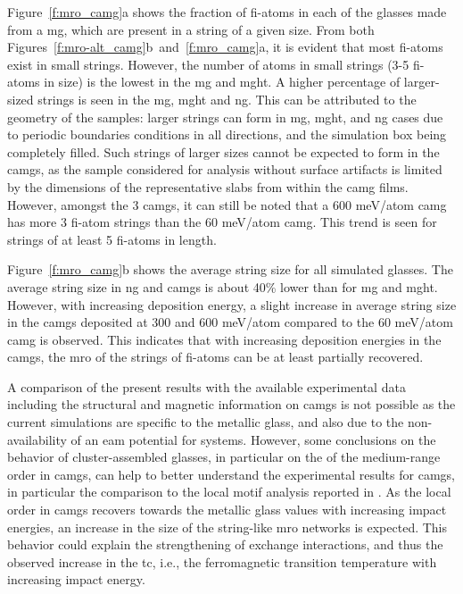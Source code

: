 \begin{changebar}
Figure~\ref{f:mro_camg}a shows the fraction of \gls{fi}-atoms in each of the glasses made from a  \gls{mg}, which are present in a string of a given size. From both Figures~\ref{f:mro-alt_camg}b~and~\ref{f:mro_camg}a, it is evident that most \gls{fi}-atoms exist in small strings. However, the number of atoms in small strings (3-5 \gls{fi}-atoms in size) is the lowest in the \gls{mg} and \gls{mght}. A higher percentage of larger-sized strings is seen in the \gls{mg}, \gls{mght} and \gls{ng}. This can be attributed to the geometry of the samples: larger strings can form in \gls{mg}, \gls{mght}, and \gls{ng} cases due to periodic boundaries conditions in all directions, and the simulation box being completely filled. Such strings of larger sizes cannot be expected to form in the \gls{camg}s, as the sample considered for analysis without surface artifacts is limited by the dimensions of the representative slabs from within the \gls{camg} films. However, amongst the 3 \gls{camg}s, it can still be noted that a 600 meV/atom \gls{camg} has more 3 \gls{fi}-atom strings than the 60 meV/atom \gls{camg}. This trend is seen for strings of at least 5 \gls{fi}-atoms in length. \par

Figure~\ref{f:mro_camg}b shows the average string size for all simulated glasses. The average string size in \gls{ng} and \gls{camg}s is about 40\% lower than for \gls{mg} and \gls{mght}. However, with increasing deposition energy, a slight increase in average string size in the \gls{camg}s deposited at 300 and 600 meV/atom compared to the 60 meV/atom \gls{camg} is observed. This indicates that with increasing deposition energies in the \gls{camg}s, the \gls{mro} of the strings of \gls{fi}-atoms can be at least partially recovered. \par

A comparison of the present results with the available experimental data including the structural and magnetic information on \fs \gls{camg}s \cite{Benel2019} is not possible as the current simulations are specific to the \cz metallic glass, and also due to the non-availability of an \gls{eam} potential for \fs systems. However, some conclusions on the behavior of cluster-assembled glasses, in particular on the of the medium-range order in \gls{camg}s, can help to better understand the experimental results for \fs \gls{camg}s, in particular the comparison to the local motif analysis reported in \cite{Benel2019}. As the local order in \gls{camg}s recovers towards the metallic glass values with increasing impact energies, an increase in the size of the string-like \gls{mro} networks is expected. This behavior could explain the strengthening of exchange interactions, and thus the observed increase in the \gls{tc}, i.e., the ferromagnetic transition temperature with increasing impact energy. \par


\end{changebar}

